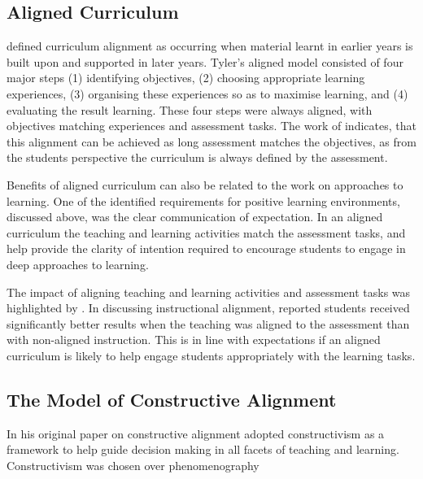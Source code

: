 
\subsection{Aligned Curriculum} %
\label{sub:aligned_curriculum}

\citet{Tyler:1969} defined curriculum alignment as occurring when material learnt in earlier years is built upon and supported in later years. Tyler's aligned model consisted of four major steps (1) identifying objectives, (2) choosing appropriate learning experiences, (3) organising these experiences so as to maximise learning, and (4) evaluating the result learning. These four steps were always aligned, with objectives matching experiences and assessment tasks. The work of \cite{Ramsden:1992} indicates, that this alignment can be achieved as long assessment matches the objectives, as from the students perspective the curriculum is always defined by the assessment.

Benefits of aligned curriculum can also be related to the work on approaches to learning. One of the identified requirements for positive learning environments, discussed above, was the clear communication of expectation. In an aligned curriculum the teaching and learning activities match the assessment tasks, and help provide the clarity of intention required to encourage students to engage in deep approaches to learning.

The impact of aligning teaching and learning activities and assessment tasks was highlighted by \citet{Cohen:1987}. In discussing instructional alignment, \citet{Cohen:1987} reported students received significantly better results when the teaching was aligned to the assessment than with non-aligned instruction. This is in line with expectations if an aligned curriculum is likely to help engage students appropriately with the learning tasks.


\subsection{The Model of Constructive Alignment} %
\label{sub:the_model_of_constructive_alignment}



In his original paper on constructive alignment \citet{Biggs:1996c} adopted constructivism as a framework to help guide decision making in all facets of teaching and learning. Constructivism was chosen over phenomenography 

